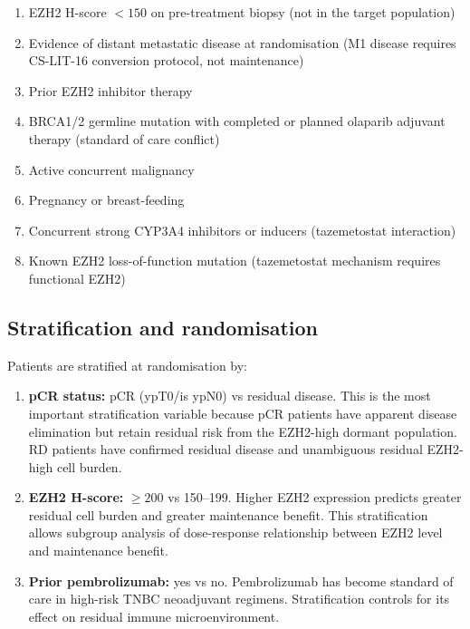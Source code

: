\documentclass[12pt, a4paper]{article}
\begin{document}
\begin{enumerate}
  \item EZH2 H-score $< 150$ on pre-treatment
        biopsy (not in the target population)

  \item Evidence of distant metastatic disease
        at randomisation (M1 disease requires
        CS-LIT-16 conversion protocol,
        not maintenance)

  \item Prior EZH2 inhibitor therapy

  \item BRCA1/2 germline mutation with completed
        or planned olaparib adjuvant therapy
        (standard of care conflict)

  \item Active concurrent malignancy

  \item Pregnancy or breast-feeding

  \item Concurrent strong CYP3A4 inhibitors
        or inducers (tazemetostat interaction)

  \item Known EZH2 loss-of-function mutation
        (tazemetostat mechanism requires
        functional EZH2)
\end{enumerate}

\subsection{Stratification and randomisation}

Patients are stratified at randomisation by:

\begin{enumerate}
  \item \textbf{pCR status:} pCR (ypT0/is ypN0)
        vs residual disease. This is the most
        important stratification variable because
        pCR patients have apparent disease
        elimination but retain residual risk
        from the EZH2-high dormant population.
        RD patients have confirmed residual
        disease and unambiguous residual EZH2-high
        cell burden.

  \item \textbf{EZH2 H-score:} $\geq200$ vs
        150--199. Higher EZH2 expression
        predicts greater residual cell burden
        and greater maintenance benefit.
        This stratification allows subgroup
        analysis of dose-response relationship
        between EZH2 level and maintenance
        benefit.

  \item \textbf{Prior pembrolizumab:} yes vs no.
        Pembrolizumab has become standard of
        care in high-risk TNBC neoadjuvant
        regimens. Stratification controls
        for its effect on residual immune
        microenvironment.
\end{enumerate}
\end{document}
